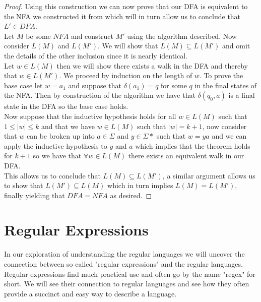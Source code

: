 \documentclass[11pt]{exam}
\begin{document}
\begin{proof}
  
Using this construction we can now prove that our DFA is equivalent to the NFA we constructed it from which will in turn allow us to conclude that $L' \in DFA$.\\

Let $M$ be some $NFA$ and construct $M'$ using the algorithm described. Now consider $L(M)$ and $L(M')$. We will show that $L(M) \subseteq L(M')$ and omit the details of the other inclusion since it is nearly identical.\\

 Let $w \in L(M)$ then we will show there exists a walk in the DFA and thereby that $w \in L(M')$. We proceed by induction on the length of $w$. To prove the base case let $w = a_1$ and suppose that $\delta(a_1) = q$ for some $q$ in the final states of the NFA. Then by construction of the algorithm we have that $\delta(q_0,a)$ is a final state in the DFA so the base case holds.\\
 
  Now suppose that the inductive hypothesis holds for all  $w \in L(M)$ such that $1 \leq |w| \leq k$ and that we have $w \in L(M)$ such that $|w| = k + 1$, now consider that $w$ can be broken up into $a \in \Sigma$ and $y \in \Sigma*$ such that  $w = ya$ and we can apply the inductive hypothesis to $y$ and $a$ which implies that the theorem holds for $k + 1$ so we have that $\forall w \in L(M)$ there exists an equivalent walk in our DFA. \\

This allows us to conclude that $L(M) \subseteq L(M')$, a similar argument allows us to show that $L(M') \subseteq L(M)$ which in turn implies $L(M) = L(M')$, finally yielding that $DFA = NFA$ as desired. 

\end{proof}

\newpage

\section{Regular Expressions}

In our exploration of understanding the regular languages we will uncover the connection between so called "regular expressions" and the regular languages. Regular expressions find much practical use and often go by the name "regex" for short. We will see their connection to regular languages and see how they often provide a succinct and easy way to describe a language.\\
\end{document}
